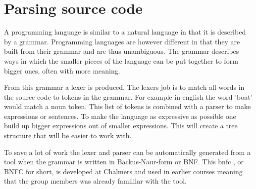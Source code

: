 \section{Parsing source code} \label{sec:bnfc}



A programming language is similar to a natural language in that it is described by a grammar. Programming languages are however different in that they are built from their grammar and are thus unambiguous.
The grammar describes ways in which the smaller pieces of the language can be put together to form bigger ones, often with more meaning. 

From this grammar a lexer is produced. The lexers job is to match all words in the source code to tokens in the grammar. For example in english the word 'boat' would match a noun token. This list of tokens is combined with a parser to make expressions or sentences. To make the language as expressive as possible one build up bigger expressions out of smaller expressions. This will create a tree structure that will be easier to work with. 

To save a lot of work the lexer and parser can be automatically generated from a tool when the grammar is written in Backus-Naur-form or BNF. This \gls{bnfc} \cite{bnfc}, or BNFC for short, is developed at Chalmers and used in earlier courses meaning that the group members was already famililar with the tool.
